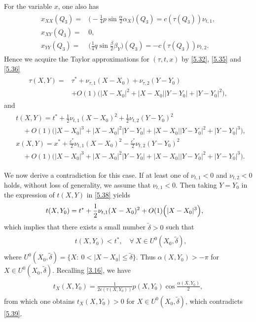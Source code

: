 \documentclass[11pt,reqno]{article}
\newcommand{\fr}{\frac}
\numberwithin{equation}{section}
\begin{document}
For the variable $x$, one also has
\begin{align}\label{5.36}
\begin{split}
x_{XX}(Q_3)=& \Big(-\fr{1}{4}p\sin\fr{\alpha}{2}\alpha_X\Big)(Q_3)=c(\tau(Q_3))\nu_{t,1}, \\[4pt]
x_{XY}(Q_3)=&0, \\[4pt]
x_{YY}(Q_3)=& \Big( \fr{1}{4}q\sin\fr{\beta}{2}\beta_Y\Big)(Q_3)=-c(\tau(Q_3))\nu_{t,2}.
\end{split}
\end{align}
Hence we acquire the Taylor approximations for $(\tau, t, x)$ by \eqref{5.32}, \eqref{5.35} and \eqref{5.36}
\begin{align}\label{5.37}
\begin{split}
\tau(X,Y)=&\tau^* +\nu_{\tau,1}(X-X_0) +\nu_{\tau,2}(Y-Y_0) \\
& +O(1)\Big(|X-X_0|^2 +|X-X_0||Y-Y_0|+|Y-Y_0|^2\Big),
\end{split}
\end{align}
and
\begin{align}\label{5.38}
\begin{split}
&t(X,Y)=t^* +\fr{1}{2}\nu_{t,1}(X-X_0)^2 +\fr{1}{2}\nu_{t,2}(Y-Y_0)^2 \\
&\quad +O(1)\Big(|X-X_0|^3 +|X-X_0|^2|Y-Y_0|+|X-X_0||Y-Y_0|^2+|Y-Y_0|^3\Big), \\
&x(X,Y)=x^* +\fr{c^*}{2}\nu_{t,1}(X-X_0)^2 -\fr{c^*}{2}\nu_{t,2}(Y-Y_0)^2 \\
&\quad +O(1)\Big(|X-X_0|^3 +|X-X_0|^2|Y-Y_0|+|X-X_0||Y-Y_0|^2+|Y-Y_0|^3\Big).
\end{split}
\end{align}

We now derive a contradiction for this case. If at least one of $\nu_{t,1}<0$ and $\nu_{t,2}<0$ holds, without loss of generality, we assume that $\nu_{t,1}<0$. Then taking $Y=Y_0$ in the expression of $t(X,Y)$ in \eqref{5.38} yields
\begin{align}
\begin{split}
&t(X,Y_0)=t^* +\fr{1}{2}\nu_{t,1}(X-X_0)^2   +O(1)\Big(|X-X_0|^3 \Big), \notag
\end{split}
\end{align}
which implies that there exists a small number $\tilde\delta>0$ such that
\begin{align}\label{5.39}
\begin{split}
&t(X,Y_0)<t^*,  \quad \forall\ X \in U^0(X_0,\tilde\delta),
\end{split}
\end{align}
where $U^0(X_0,\tilde\delta)=\{X:\ 0<|X-X_0|\leq \tilde\delta\}$. Thus $\alpha(X,Y_0)>-\pi$ for $X\in U^0(X_0,\tilde\delta)$.
Recalling \eqref{3.16}, we have
\begin{align}\label{5.40}
\begin{split}
t_X(X,Y_0)=\fr{1}{2c(\tau(X,Y_0))}p(X,Y_0)\cos\fr{\alpha(X,Y_0)}{2},
\end{split}
\end{align}
from which one obtains $t_X(X,Y_0)>0$ for $X\in U^0(X_0,\tilde\delta)$, which contradicts \eqref{5.39}.
\end{document}
